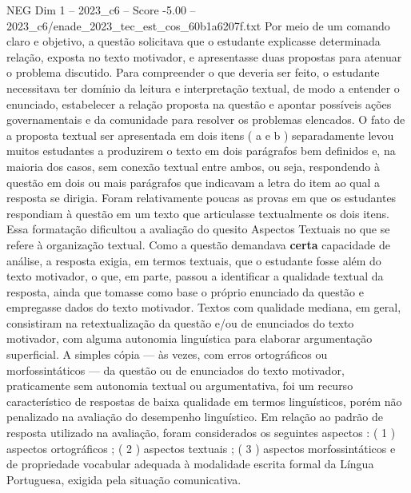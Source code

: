 \begin{textsample}{NEG Dim 1 – 2023\_c6 – Score -5.00 – 2023\_c6/enade\_2023\_tec\_est\_cos\_60b1a6207f.txt}
Por meio de um comando claro e objetivo, a questão solicitava que o estudante explicasse determinada relação, exposta no texto motivador, e apresentasse duas propostas para atenuar o problema discutido.
Para compreender o que deveria ser feito, o estudante necessitava ter domínio da leitura e interpretação textual, de modo a entender o enunciado, estabelecer a relação proposta na questão e apontar possíveis ações governamentais e da comunidade para resolver os problemas elencados.
O fato de a proposta textual ser apresentada em dois itens ( a e b ) separadamente levou muitos estudantes a produzirem o texto em dois parágrafos bem definidos e, na maioria dos casos, sem conexão textual entre ambos, ou seja, respondendo à questão em dois ou mais parágrafos que indicavam a letra do item ao qual a resposta se dirigia.
Foram relativamente poucas as provas em que os estudantes respondiam à questão em um texto que articulasse textualmente os dois itens.
Essa formatação dificultou a avaliação do quesito Aspectos Textuais no que se refere à organização textual.
Como a questão demandava \textbf{certa} capacidade de análise, a resposta exigia, em termos textuais, que o estudante fosse além do texto motivador, o que, em parte, passou a identificar a qualidade textual da resposta, ainda que tomasse como base o próprio enunciado da questão e empregasse dados do texto motivador.
Textos com qualidade mediana, em geral, consistiram na retextualização da questão e/ou de enunciados do texto motivador, com alguma autonomia linguística para elaborar argumentação superficial.
A simples cópia — às vezes, com erros ortográficos ou morfossintáticos — da questão ou de enunciados do texto motivador, praticamente sem autonomia textual ou argumentativa, foi um recurso característico de respostas de baixa qualidade em termos linguísticos, porém não penalizado na avaliação do desempenho linguístico.
Em relação ao padrão de resposta utilizado na avaliação, foram considerados os seguintes aspectos : ( 1 ) aspectos ortográficos ; ( 2 ) aspectos textuais ; ( 3 ) aspectos morfossintáticos e de propriedade vocabular adequada à modalidade escrita formal da Língua Portuguesa, exigida pela situação comunicativa.

\end{textsample}
